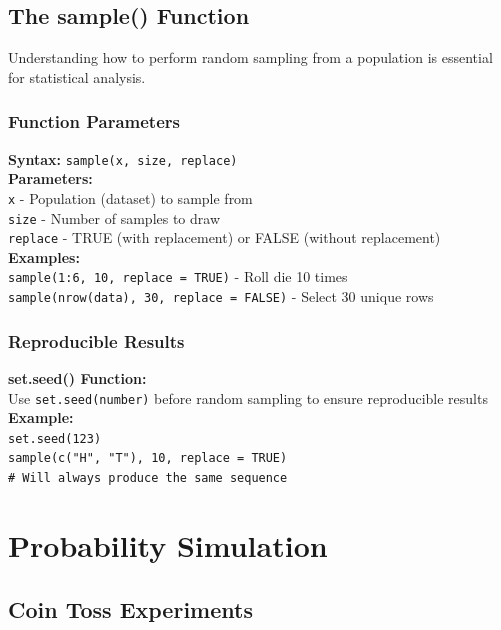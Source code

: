 \documentclass[11pt,a4paper]{article}
\begin{document}
\subsection{The sample() Function}

Understanding how to perform random sampling from a population is essential for statistical analysis.

\subsubsection{Function Parameters}

\begin{formulabox}
\textbf{Syntax:} \texttt{sample(x, size, replace)}\\[0.3cm]
\textbf{Parameters:}\\
\texttt{x} - Population (dataset) to sample from\\
\texttt{size} - Number of samples to draw\\
\texttt{replace} - TRUE (with replacement) or FALSE (without replacement)\\[0.3cm]
\textbf{Examples:}\\
\texttt{sample(1:6, 10, replace = TRUE)} - Roll die 10 times\\
\texttt{sample(nrow(data), 30, replace = FALSE)} - Select 30 unique rows
\end{formulabox}

\subsubsection{Reproducible Results}

\begin{formulabox}
\textbf{set.seed() Function:}\\
Use \texttt{set.seed(number)} before random sampling to ensure reproducible results\\[0.3cm]
\textbf{Example:}\\
\texttt{set.seed(123)}\\
\texttt{sample(c("H", "T"), 10, replace = TRUE)}\\
\texttt{\# Will always produce the same sequence}
\end{formulabox}

\section{Probability Simulation}

\subsection{Coin Toss Experiments}
\end{document}
